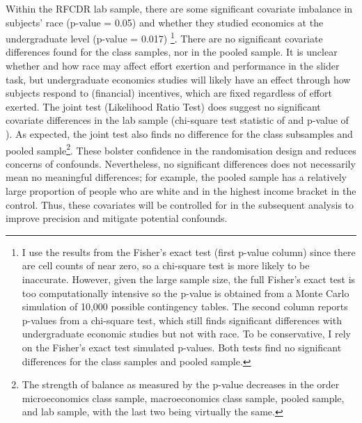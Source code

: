 \documentclass[12pt, letterpaper, DIV=11, numbers=noendperiod]{article}
\begin{document}
Within the RFCDR lab sample, there are some significant covariate imbalance in subjects' race (p-value = 0.05) and whether they studied economics at the undergraduate level (p-value = 0.017) \footnote{I use the results from the Fisher's exact test (first p-value column) since there are cell counts of near zero, so a chi-square test is more likely to be inaccurate. However, given the large sample size, the full Fisher's exact test is too computationally intensive so the p-value is obtained from a Monte Carlo simulation of 10,000 possible contingency tables. The second column reports p-values from a chi-square test, which still finds significant differences with undergraduate economic studies but not with race. To be conservative, I rely on the Fisher's exact test simulated p-values. Both tests find no significant differences for the class samples and pooled sample.}. There are no significant covariate differences found for the class samples, nor in the pooled sample. It is unclear whether and how race may affect effort exertion and performance in the slider task, but undergraduate economics studies will likely have an effect through how subjects respond to (financial) incentives, which are fixed regardless of effort exerted. The joint test (Likelihood Ratio Test) does suggest no significant covariate differences in the lab sample (chi-square test statistic of \BalanceLabChisq{} and p-value of \BalanceLabPval{}). As expected, the joint test also finds no difference for the class subsamples and pooled sample\footnote{The strength of balance as measured by the p-value decreases in the order microeconomics class sample, macroeconomics class sample, pooled sample, and lab sample, with the last two being virtually the same.}. These bolster confidence in the randomisation design and reduces concerns of confounds. Nevertheless, no significant differences does not necessarily mean no meaningful differences; for example, the pooled sample has a relatively large proportion of people who are white and in the highest income bracket in the control. Thus, these covariates will be controlled for in the subsequent analysis to improve precision and mitigate potential confounds.

\begin{table}
\centering
{\par}
{\par}
{\par}
{\par}
\caption{Summary of slider task performance metrics}\label{tbl-slider-performance-sumstats}
\end{table}
\end{document}
